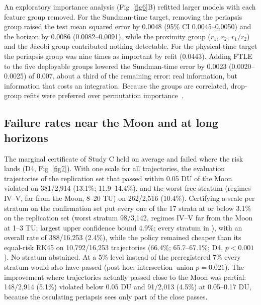 \documentclass[10pt,letterpaper]{article}
\begin{document}
An exploratory importance analysis (Fig~\ref{fig6}B) refitted larger models with each feature group removed. For the Sundman-time target, removing the periapsis group raised the test mean squared error by 0.0048 (95\% CI 0.0045--0.0050) and the horizon by 0.0086 (0.0082--0.0091), while the proximity group ($r_{1}$, $r_{2}$, $r_{1}/r_{2}$) and the Jacobi group contributed nothing detectable. For the physical-time target the periapsis group was nine times as important by refit (0.0443). Adding FTLE to the five deployable groups lowered the Sundman-time error by 0.0023 (0.0020--0.0025) of 0.007, about a third of the remaining error: real information, but information that costs an integration. Because the groups are correlated, drop-group refits were preferred over permutation importance~\cite{strobl2008}.

\subsection*{Failure rates near the Moon and at long horizons}
The marginal certificate of Study C held on average and failed where the risk lands (D4, Fig~\ref{fig7}). With one scale for all trajectories, the evaluation trajectories of the replication set that passed within 0.05 DU of the Moon violated on 381/2,914 (13.1\%; 11.9--14.4\%), and the worst free stratum (regimes IV--V, far from the Moon, 8--20 TU) on 262/2,516 (10.4\%). Certifying a scale per stratum on the confirmation set put every one of the 17 strata at or below 3.1\% on the replication set (worst stratum 98/3,142, regimes IV--V far from the Moon at 1--3 TU; largest upper confidence bound 4.9\%; every stratum in ), with an overall rate of 388/16,253 (2.4\%), while the policy remained cheaper than its equal-risk RK45 on 10,792/16,253 trajectories (66.4\%; 65.7--67.1\%; D4, $p < 0.001$). No stratum abstained. At a 5\% level instead of the preregistered 7\% every stratum would also have passed (post hoc; intersection--union $p = 0.021$). The improvement where trajectories actually passed close to the Moon was partial: 148/2,914 (5.1\%) violated below 0.05 DU and 91/2,013 (4.5\%) at 0.05--0.17 DU, because the osculating periapsis sees only part of the close passes.
\end{document}
